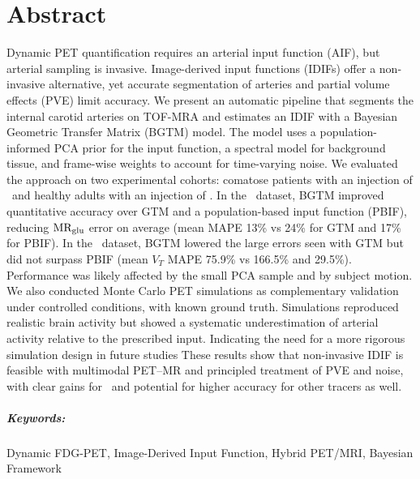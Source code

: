 \chapter*{Abstract}
Dynamic PET quantification requires an arterial input function (AIF), but arterial sampling is invasive.
Image-derived input functions (IDIFs) offer a non-invasive alternative, yet accurate segmentation of arteries and partial volume effects (PVE) limit accuracy.
We present an automatic pipeline that segments the internal carotid arteries on TOF-MRA and estimates an IDIF with a Bayesian Geometric Transfer Matrix (BGTM) model.
The model uses a population-informed PCA prior for the input function, a spectral model for background tissue, and frame-wise weights to account for time-varying noise.
We evaluated the approach on two experimental cohorts: comatose patients with an injection of \fdg\ and healthy adults with an injection of \yohimbine.
In the \fdg\ dataset, BGTM improved quantitative accuracy over GTM and a population-based input function (PBIF), reducing \(\text{MR}_{\text{glu}}\) error on average (mean MAPE 13\% vs 24\% for GTM and 17\% for PBIF).
In the \yohimbine\ dataset, BGTM lowered the large errors seen with GTM but did not surpass PBIF (mean \(V_T\) MAPE 75.9\% vs 166.5\% and 29.5\%).
Performance was likely affected by the small PCA sample and by subject motion.
We also conducted Monte Carlo PET simulations as complementary validation under controlled conditions, with known ground truth.
Simulations reproduced realistic brain activity but showed a systematic underestimation of arterial activity relative to the prescribed input.
Indicating the need for a more rigorous simulation design in future studies
These results show that non-invasive IDIF is feasible with multimodal PET--MR and principled treatment of PVE and noise, with clear gains for \fdg\ and potential for higher accuracy for other tracers as well.
\paragraph{Keywords:} Dynamic FDG-PET, Image-Derived Input Function, Hybrid PET/MRI, Bayesian Framework

